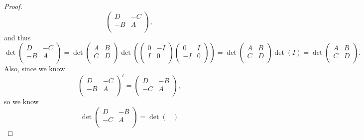 \begin{proof}
\[\begin{pmatrix}
            D & -C  \\
            -B & A  \\
        \end{pmatrix},
    \] and thus 
    \[
        \det \begin{pmatrix}
            D & -C  \\
            -B & A  \\
        \end{pmatrix} = \det \begin{pmatrix}
            A & B  \\
            C & D  \\
        \end{pmatrix} \det \left( \begin{pmatrix}
            0 & -I  \\
            I & 0  \\
        \end{pmatrix} \begin{pmatrix}
            0 & I  \\
            -I & 0  \\
        \end{pmatrix} \right) = \det \begin{pmatrix}
            A & B  \\
            C & D  \\
        \end{pmatrix} \det (I) = \det \begin{pmatrix}
            A & B  \\
            C & D  \\
        \end{pmatrix}.
    \]
    Also, since we know 
    \[
        \begin{pmatrix}
            D & -C  \\
            -B & A  \\
        \end{pmatrix}^t = \begin{pmatrix}
            D & -B  \\
            -C & A  \\
        \end{pmatrix},
    \] so we know
    \[
        \det \begin{pmatrix}
            D & -B  \\
            -C & A  \\
        \end{pmatrix} = \det \begin{pmatrix}

\end{pmatrix}\]
\end{proof}
